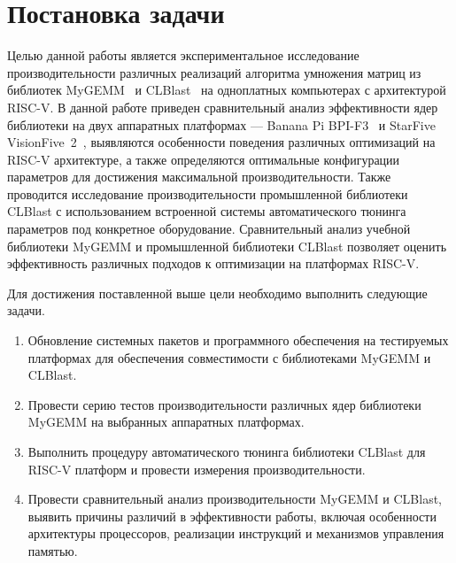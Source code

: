 
\section{Постановка задачи}
\label{sec:task}

Целью данной работы является экспериментальное исследование производительности различных реализаций алгоритма умножения матриц из библиотек MyGEMM~\cite{mygemm_repo} и CLBlast~\cite{clblast} на одноплатных компьютерах с архитектурой RISC-V. В данной работе приведен сравнительный анализ эффективности ядер библиотеки на двух аппаратных платформах --- Banana Pi BPI-F3~\cite{bananapi_f3_wiki} и StarFive VisionFive~2~\cite{visionfive2_wiki}, выявляются особенности поведения различных оптимизаций на RISC-V архитектуре, а также определяются оптимальные конфигурации параметров для достижения максимальной производительности. Также проводится исследование производительности промышленной библиотеки CLBlast с использованием встроенной системы автоматического тюнинга параметров под конкретное оборудование. Сравнительный анализ учебной библиотеки MyGEMM и промышленной библиотеки CLBlast позволяет оценить эффективность различных подходов к оптимизации на платформах RISC-V.

Для достижения поставленной выше цели необходимо выполнить следующие задачи.
\begin{enumerate}
    \item Обновление системных пакетов и программного обеспечения на тестируемых платформах для обеспечения совместимости с библиотеками MyGEMM и CLBlast.
    \item Провести серию тестов производительности различных ядер библиотеки MyGEMM на выбранных аппаратных платформах.
    \item Выполнить процедуру автоматического тюнинга библиотеки CLBlast для RISC-V платформ и провести измерения производительности.
    \item Провести сравнительный анализ производительности MyGEMM и CLBlast, выявить причины различий в эффективности работы, включая особенности архитектуры процессоров, реализации инструкций и механизмов управления памятью.
\end{enumerate}